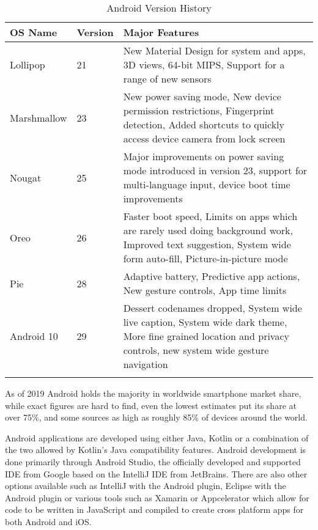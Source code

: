 \begin{longtable}{ |p{3cm}|p{2cm}|p{8cm}|  }
		\hline
		\textbf{OS Name} & \textbf{Version} & \textbf{Major Features} \\
		\hline
		Lollipop & 21 & New Material Design for system and apps, 3D views, 64-bit MIPS, Support for a range of new sensors\cite{evolutionofandroidoschangesref}\\
		\hline
		Marshmallow & 23 & New power saving mode, New device permission restrictions, Fingerprint detection, Added shortcuts to quickly access device camera from lock screen\cite{evolutionofandroidoschangesref}\\
		\hline
		Nougat & 25 & Major improvements on power saving mode introduced in version 23, support for multi-language input, device boot time improvements\cite{evolutionofandroidoschangesref}\cite{androidnougatchanges}\\
		\hline
		Oreo & 26 & Faster boot speed, Limits on apps which are rarely used doing background work, Improved text suggestion, System wide form auto-fill, Picture-in-picture mode\cite{androidoreochanges}\\
		\hline
		Pie & 28 & Adaptive battery, Predictive app actions, New gesture controls, App time limits\cite{androidpiechanges}\\
		\hline
		Android 10 & 29 & Dessert codenames dropped, System wide live caption, System wide dark theme, More fine grained location and privacy controls, new system wide gesture navigation\cite{android10ref}\\
		\hline
    \caption{Android Version History}
	\label{androidevolutionrable}
\end{longtable}

As of 2019 Android holds the majority in worldwide smartphone market share, while exact figures are hard to find, even the lowest estimates put its share at over 75\%\cite{androidmarketshare1ref}, and some sources as high as roughly 85\%\cite{androidmarketshare2ref}\cite{evolutionofandroidmarketshareref} of devices around the world.

Android applications are developed using either Java, Kotlin or a combination of the two allowed by Kotlin’s Java compatibility features. Android development is done primarily through Android Studio, the officially developed and supported IDE from Google based on the IntelliJ IDE from JetBrains. There are also other options available such as IntelliJ with the Android plugin, Eclipse with the Android plugin or various tools such as Xamarin or Appcelerator which allow for code to be written in JavaScript and compiled to create cross platform apps for both Android and iOS.

